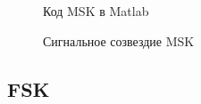 \documentclass[a4paper,14pt]{extarticle}
\begin{document}
\begin{figure}[H]
\caption{Код MSK в Matlab}
\label{9}
\end{figure}

\begin{figure}[H]
\caption{Сигнальное созвездие MSK}
\label{10}
\end{figure}

\subsection{FSK}
\end{document}
